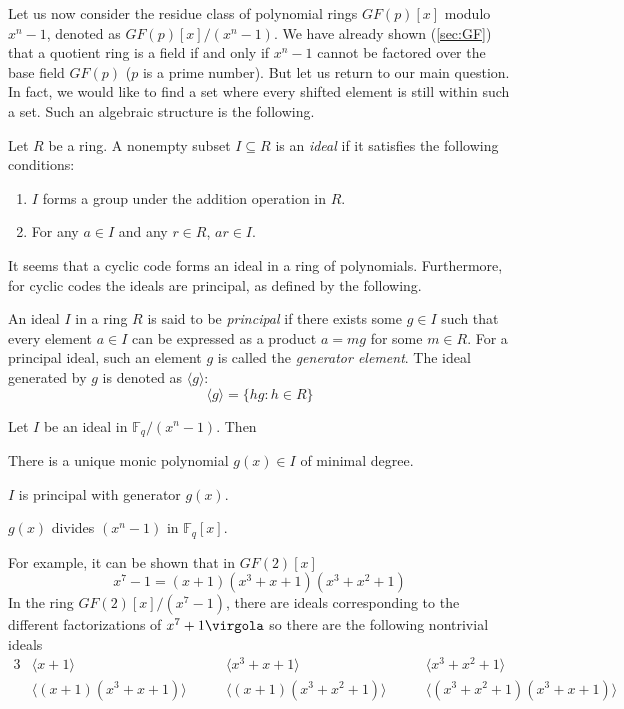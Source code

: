 Let us now consider the residue class of polynomial rings \( GF(p)[x] \) modulo \(x^n-1\), denoted as \(GF(p)[x]/(x^n-1)\). We have already shown (\ref{sec:GF}) that a quotient ring is a field if and only if \(x^n-1\) cannot be factored over the base field \(GF(p)\) ($p$ is a prime number).
But let us return to our main question. In fact, we would like to find a set where every shifted element is still within such a set. Such an algebraic structure is the following.

\begin{Def}
Let $R$ be a ring. A nonempty subset $I\subseteq R$ is an \emph{ideal} if it satisfies the following conditions:
\begin{enumerate}
\item $I$ forms a group under the addition operation in $R$.
\item For any \( a\in I\) and any \(r\in R\), \(ar\in I\).
\end{enumerate}
\end{Def}
It seems that a cyclic code forms an ideal in a ring of polynomials. Furthermore, for cyclic codes the ideals are principal, as defined by the following.

\begin{Def}
An ideal $I$ in a ring $R$ is said to be \emph{principal} if there exists some \(g\in I\) such that every element \(a \in I \) can be expressed as a product \(a=mg\) for some \(m \in R\). For a principal ideal, such an element \(g\) is called the \emph{generator element}. The ideal generated by \(g\) is denoted as \(\langle g \rangle\):
\[
\langle g \rangle= \{hg: h \in R \}
\]
\end{Def}

\begin{Theorem} \label{th:ideals}
Let $I$ be an ideal in \( \mathbb F_q /(x^n-1) \). Then
\enumerate
\item There is a unique monic polynomial \(g(x) \in I\) of minimal degree.
\item $I$ is principal with generator $g(x)$.
\item \(g(x)\) divides \( (x^n -1) \) in \( \mathbb F_q[x] \).
\end{Theorem}
For example, it can be shown that in \(GF(2)[x]\)
\[
x^7-1=(x+1)(x^3+x+1)(x^3+x^2+1)
\]
In the ring \( GF(2)[x]/(x^7-1) \), there are ideals corresponding to the different factorizations of \(x^7+1 \virgola\) so there are the following nontrivial ideals
\begin{alignat*}3
     & \langle x+1 \rangle & \qquad \langle x^3+x+1\rangle & \qquad \langle x^3+x^2+1\rangle \\
     & \langle (x+1)(x^3+x+1)\rangle & \qquad \langle (x+1)(x^3+x^2+1)\rangle & \qquad
     \langle (x^3+x^2+1)(x^3+x+1)\rangle
\end{alignat*}

